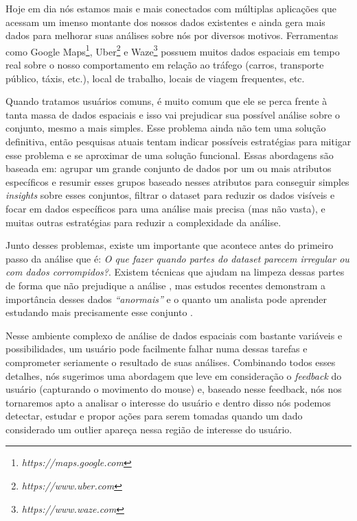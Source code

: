 Hoje em dia nós estamos mais e mais conectados com múltiplas aplicações que acessam um imenso montante dos nossos dados existentes e ainda gera mais dados para melhorar suas análises sobre nós por diversos motivos. Ferramentas como Google Maps\footnote{\it https://maps.google.com}, Uber\footnote{\it https://www.uber.com} e Waze\footnote{\it https://www.waze.com} possuem muitos dados espaciais em tempo real sobre o nosso comportamento em relação ao tráfego (carros, transporte público, táxis, etc.), local de trabalho, locais de viagem frequentes, etc.

Quando tratamos usuários comuns, é muito comum que ele se perca frente à tanta massa de dados espaciais e isso vai prejudicar sua possível análise sobre o conjunto, mesmo a mais simples. Esse problema ainda não tem uma solução definitiva, então pesquisas atuais tentam indicar possíveis estratégias para mitigar esse problema e se aproximar de uma solução funcional. Essas abordagens são baseada em: agrupar um grande conjunto de dados por um ou mais atributos específicos e resumir esses grupos baseado nesses atributos para conseguir simples \textit{insights} sobre esses conjuntos, filtrar o dataset para reduzir os dados visíveis e focar em dados específicos para uma análise mais precisa (mas não vasta), e muitas outras estratégias para reduzir a complexidade da análise.

Junto desses problemas, existe um importante que acontece antes do primeiro passo da análise que é: \textit{O que fazer quando partes do dataset parecem irregular ou com dados corrompidos?}. Existem técnicas que ajudam na limpeza dessas partes de forma que não prejudique a análise \cite{10.1007/978-3-319-11116-2_2}, mas estudos recentes demonstram a importância desses dados \textit{``anormais''} e o quanto um analista pode aprender estudando mais precisamente esse conjunto \cite{DBLP:journals/debu/FreireCVZ16}.

Nesse ambiente complexo de análise de dados espaciais com bastante variáveis e possibilidades, um usuário pode facilmente falhar numa dessas tarefas e comprometer seriamente o resultado de suas análises. Combinando todos esses detalhes, nós sugerimos uma abordagem que leve em consideração o \textit{feedback} do usuário (capturando o movimento do mouse) e, baseado nesse feedback, nós nos tornaremos apto a analisar o interesse do usuário e dentro disso nós podemos detectar, estudar e propor ações para serem tomadas quando um dado considerado um outlier apareça nessa região de interesse do usuário.


